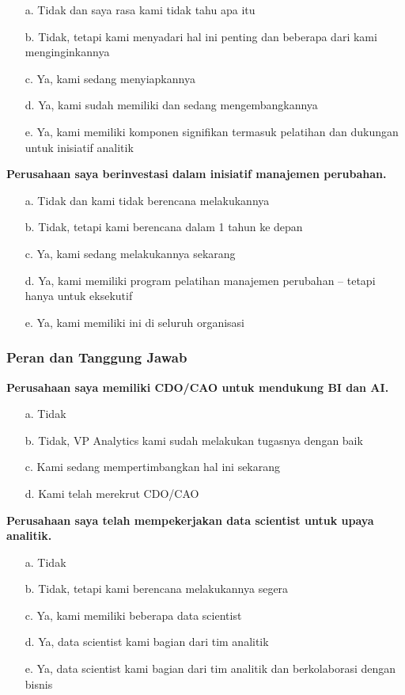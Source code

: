 \documentclass{article}
\begin{document}
\begin{enumerate}
	\item[a.] Tidak dan saya rasa kami tidak tahu apa itu
	\item[b.] Tidak, tetapi kami menyadari hal ini penting dan beberapa dari kami menginginkannya
	\item[c.] Ya, kami sedang menyiapkannya
	\item[d.] Ya, kami sudah memiliki dan sedang mengembangkannya
	\item[e.] Ya, kami memiliki komponen signifikan termasuk pelatihan dan dukungan untuk inisiatif analitik
\end{enumerate}

\textbf{Perusahaan saya berinvestasi dalam inisiatif manajemen perubahan.}

\begin{enumerate}
	\item[a.] Tidak dan kami tidak berencana melakukannya
	\item[b.] Tidak, tetapi kami berencana dalam 1 tahun ke depan
	\item[c.] Ya, kami sedang melakukannya sekarang
	\item[d.] Ya, kami memiliki program pelatihan manajemen perubahan – tetapi hanya untuk eksekutif
	\item[e.] Ya, kami memiliki ini di seluruh organisasi
\end{enumerate}

\subsubsection{Peran dan Tanggung Jawab}

\textbf{Perusahaan saya memiliki CDO/CAO untuk mendukung BI dan AI.}

\begin{enumerate}
	\item[a.] Tidak
	\item[b.] Tidak, VP Analytics kami sudah melakukan tugasnya dengan baik
	\item[c.] Kami sedang mempertimbangkan hal ini sekarang
	\item[d.] Kami telah merekrut CDO/CAO
\end{enumerate}

\textbf{Perusahaan saya telah mempekerjakan data scientist untuk upaya analitik.}

\begin{enumerate}
	\item[a.] Tidak
	\item[b.] Tidak, tetapi kami berencana melakukannya segera
	\item[c.] Ya, kami memiliki beberapa data scientist
	\item[d.] Ya, data scientist kami bagian dari tim analitik
	\item[e.] Ya, data scientist kami bagian dari tim analitik dan berkolaborasi dengan bisnis
\end{enumerate}
\end{document}
